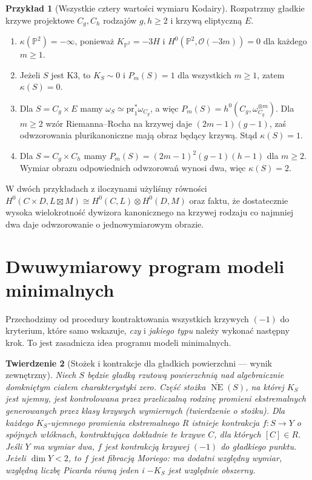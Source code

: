 \documentclass[11pt,a4paper,openany]{report}
\numberwithin{equation}{section}
\theoremstyle{plain}
\newtheorem{twierdzenie}{Twierdzenie}[section]
\theoremstyle{definition}
\newtheorem{przyklad}[twierdzenie]{Przykład}
\theoremstyle{remark}
\newcommand{\PP}{\mathbb P}
\begin{document}
\begin{przyklad}[Wszystkie cztery wartości wymiaru Kodairy]
\label{prz:ga8-kodaira-four}
Rozpatrzmy gładkie krzywe projektowe $C_g,C_h$
rodzajów $g,h\ge2$ i krzywą eliptyczną $E$.
\begin{enumerate}[label=(\roman*)]
\item $\kappa(\PP^2)=-\infty$, ponieważ
$K_{\PP^2}=-3H$ i $H^0(\PP^2,\mathcal O(-3m))=0$
dla każdego $m\ge1$.
\item Jeżeli $S$ jest K3, to $K_S\sim0$ i
$P_m(S)=1$ dla wszystkich $m\ge1$, zatem $\kappa(S)=0$.
\item Dla $S=C_g\times E$ mamy
$\omega_S\simeq\mathrm{pr}_1^*\omega_{C_g}$,
a więc $P_m(S)=h^0(C_g,\omega_{C_g}^{\otimes m})$.
Dla $m\ge2$ wzór Riemanna--Rocha na krzywej
daje $(2m-1)(g-1)$, zaś odwzorowania
plurikanoniczne mają obraz będący krzywą.
Stąd $\kappa(S)=1$.
\item Dla $S=C_g\times C_h$ mamy
$P_m(S)=(2m-1)^2(g-1)(h-1)$ dla $m\ge2$.
Wymiar obrazu odpowiednich odwzorowań wynosi dwa,
więc $\kappa(S)=2$.
\end{enumerate}
W dwóch przykładach z iloczynami użyliśmy równości
$H^0(C\times D,L\boxtimes M)
\cong H^0(C,L)\otimes H^0(D,M)$ oraz faktu,
że dostatecznie wysoka wielokrotność dywizora
kanonicznego na krzywej rodzaju co najmniej dwa
daje odwzorowanie o jednowymiarowym obrazie.
\end{przyklad}

\section{Dwuwymiarowy program modeli minimalnych}
\label{sec:ga8-surface-mmp}

Przechodzimy od procedury kontraktowania wszystkich
krzywych $(-1)$ do kryterium, które samo wskazuje,
\emph{czy} i \emph{jakiego typu} należy wykonać następny krok.
To jest zasadnicza idea programu modeli minimalnych.

\begin{twierdzenie}[Stożek i kontrakcje dla gładkich powierzchni — wynik zewnętrzny]
\label{tw:ga8-surface-contraction}
Niech $S$ będzie gładką rzutową powierzchnią nad
algebraicznie domkniętym ciałem charakterystyki zero.
Część stożka $\overline{\operatorname{NE}}(S)$, na której
$K_S$ jest ujemny, jest kontrolowana przez przeliczalną
rodzinę promieni ekstremalnych generowanych przez klasy
krzywych wymiernych (twierdzenie o stożku).
Dla każdego $K_S$-ujemnego promienia ekstremalnego $R$
istnieje kontrakcja $f:S\to Y$ o spójnych włóknach,
kontraktująca dokładnie te krzywe $C$, dla których
$[C]\in R$. Jeśli $Y$ ma wymiar dwa, $f$ jest
kontrakcją krzywej $(-1)$ do gładkiego punktu.
Jeżeli $\dim Y<2$, to $f$ jest \emph{fibracją Moriego}:
ma dodatni względny wymiar, względną liczbę Picarda
równą jeden i $-K_S$ jest względnie obszerny.
\end{twierdzenie}
\end{document}
